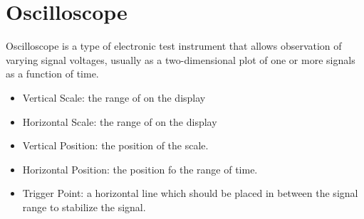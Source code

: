 \chapter{Oscilloscope}

  \par Oscilloscope is a type of electronic test instrument that allows
  observation of varying signal voltages, usually as a two-dimensional
  plot of one or more signals as a function of time.

\begin{itemize}
  \item Vertical Scale: the range of  on the display
  \item Horizontal Scale: the range of  on the display
  \item Vertical Position: the position of the  scale.
  \item Horizontal Position: the position fo the range of time.
  \item Trigger Point: a horizontal line which should be placed
    in between the signal range to stabilize the signal.
\end{itemize}

